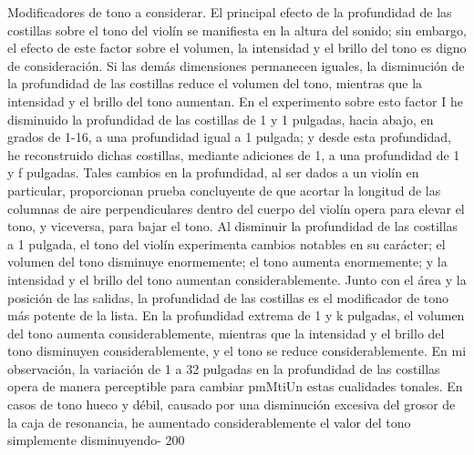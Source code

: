 Modificadores de tono a considerar. El principal efecto de la profundidad de las costillas sobre el tono del violín se manifiesta en la altura del sonido; sin embargo, el efecto de este factor sobre el volumen, la intensidad y el brillo del tono es digno de consideración. Si las demás dimensiones permanecen iguales, la disminución de la profundidad de las costillas reduce el volumen del tono, mientras que la intensidad y el brillo
del tono aumentan. En el experimento sobre esto
factor I he disminuido la profundidad de las costillas de 1 y 1 pulgadas, hacia abajo, en grados de 1-16, a una profundidad igual a 1 pulgada; y desde esta profundidad, he reconstruido dichas costillas, mediante adiciones de 1, a una profundidad de 1 y f pulgadas. Tales cambios en la profundidad, al ser dados a un violín en particular, proporcionan prueba concluyente de que acortar la longitud de las columnas de aire perpendiculares dentro del cuerpo del violín opera para elevar el tono, y viceversa, para bajar el tono. Al disminuir la profundidad de las costillas a 1 pulgada, el tono del violín experimenta cambios notables en su carácter; el volumen del tono disminuye enormemente; el tono aumenta enormemente;
y la intensidad y el brillo del tono aumentan considerablemente. Junto con el área y la posición de las salidas, la profundidad de las costillas es el modificador de tono más potente de la lista. En la profundidad extrema de 1 y k pulgadas, el volumen del tono aumenta considerablemente, mientras que la intensidad y el brillo del tono disminuyen considerablemente, y el tono se reduce considerablemente. En mi observación, la variación de 1 a 32 pulgadas en la profundidad de las costillas opera de manera perceptible para cambiar pmMtiUn estas cualidades tonales. En casos de tono hueco y débil, causado por una disminución excesiva del grosor de la caja de resonancia, he aumentado considerablemente el valor del tono simplemente disminuyendo-
200

